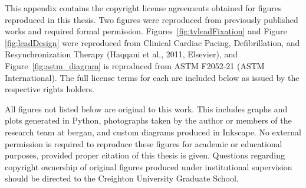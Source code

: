 




This appendix contains the copyright license agreements obtained for figures reproduced in this thesis. Two figures were reproduced from previously published works and required formal permission. Figures~\ref{fig:tvleadFixation} and Figure \ref{fig:leadDesign} were reproduced from Clinical Cardiac Pacing, Defibrillation, and Resynchronization Therapy (Haqqani et al., 2011, Elsevier), and Figure~\ref{fig:astm_diagram} is reproduced from ASTM F2052-21 (ASTM International). The full license terms for each are included below as issued by the respective rights holders. 

All figures not listed below are original to this work. This includes graphs and plots generated in Python, photographs taken by the author or members of the research team at \gls{bergan}, and custom diagrams produced in Inkscape. No external permission is required to reproduce these figures for academic or educational purposes, provided proper citation of this thesis is given. Questions regarding copyright ownership of original figures produced under institutional supervision should be directed to the Creighton University Graduate School.


\label{app:B1}




\label{app:B2}

